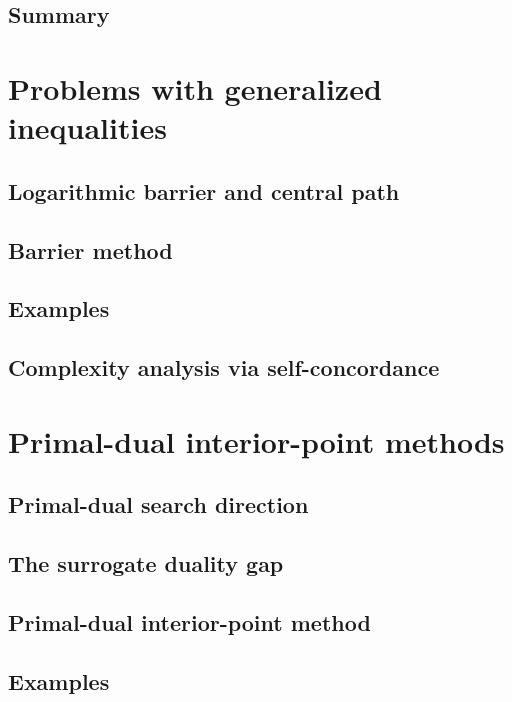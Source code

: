 \subsection{Summary}

\section{Problems with generalized inequalities}

\subsection{Logarithmic barrier and central path}

\subsection{Barrier method}

\subsection{Examples}

\subsection{Complexity analysis via self-concordance}

\section{Primal-dual interior-point methods}

\subsection{Primal-dual search direction}

\subsection{The surrogate duality gap}

\subsection{Primal-dual interior-point method}

\subsection{Examples}


